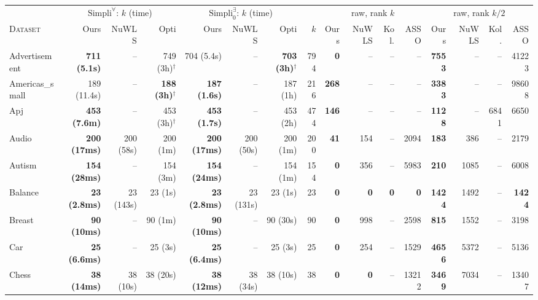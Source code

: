 \begin{table}[h]
\centering
\setlength{\tabcolsep}{0.2pt}\renewcommand{\arraystretch}{0.8}
\scriptsize
\begin{tabular}{l rrr rrr r rrrr rrrr}
\toprule
 & \multicolumn{3}{c}{$\text{Simpli}^{\forall}$: $k$ (time)} & \multicolumn{3}{c}{$\text{Simpli}^{\exists}_{0}$: $k$ (time)} & & \multicolumn{4}{c}{raw, rank $k$} & \multicolumn{4}{c}{raw, rank $k/2$} \\
\cmidrule(lr){2-4}\cmidrule(lr){5-7}\cmidrule(lr){9-12}\cmidrule(lr){13-16}
\textsc{Dataset} & Ours & NuWLS & Opti & Ours & NuWLS & Opti & $k$ & Ours & NuWLS & Kol. & ASSO & Ours & NuWLS & Kol. & ASSO \\
\midrule
Advertisement & \textbf{711 (5.1s)} & -- & 749 (3h)${}^{\dagger}$ & 704 (5.4s) & -- & \textbf{703 (3h)}${}^{\dagger}$ & 794 & \textbf{0} & -- & -- & -- & \textbf{7553} & -- & -- & 41223 \\
Americas\_small & 189 (11.4s) & -- & \textbf{188 (3h)}${}^{\dagger}$ & \textbf{187 (1.6s)} & -- & 187 (1h) & 216 & \textbf{268} & -- & -- & -- & \textbf{3383} & -- & -- & 98608 \\
Apj & \textbf{453 (7.6m)} & -- & 453 (3h)${}^{\dagger}$ & \textbf{453 (1.7s)} & -- & 453 (2h) & 474 & \textbf{146} & -- & -- & -- & \textbf{1128} & -- & 6841 & 6650 \\
Audio & \textbf{200 (17ms)} & 200 (58s) & 200 (1m) & \textbf{200 (17ms)} & 200 (50s) & 200 (1m) & 200 & \textbf{41} & 154 & -- & 2094 & \textbf{183} & 386 & -- & 2179 \\
Autism & \textbf{154 (28ms)} & -- & 154 (3m) & \textbf{154 (24ms)} & -- & 154 (1m) & 154 & \textbf{0} & 356 & -- & 5983 & \textbf{210} & 1085 & -- & 6008 \\
Balance & \textbf{23 (2.8ms)} & 23 (143s) & 23 (1s) & \textbf{23 (2.8ms)} & 23 (131s) & 23 (1s) & 23 & \textbf{0} & \textbf{0} & \textbf{0} & \textbf{0} & \textbf{1424} & 1492 & -- & \textbf{1424} \\
Breast & \textbf{90 (10ms)} & -- & 90 (1m) & \textbf{90 (10ms)} & -- & 90 (30s) & 90 & \textbf{0} & 998 & -- & 2598 & \textbf{815} & 1552 & -- & 3198 \\
Car & \textbf{25 (6.6ms)} & -- & 25 (3s) & \textbf{25 (6.4ms)} & -- & 25 (3s) & 25 & \textbf{0} & 254 & -- & 1529 & \textbf{4656} & 5372 & -- & 5136 \\
Chess & \textbf{38 (14ms)} & 38 (10s) & 38 (20s) & \textbf{38 (12ms)} & 38 (34s) & 38 (10s) & 38 & \textbf{0} & \textbf{0} & -- & 13212 & \textbf{3469} & 7034 & -- & 13407 \\

\end{tabular}
\end{table}
